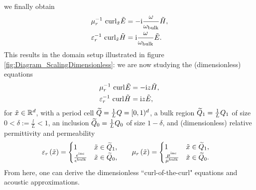 we finally obtain
\begin{align*}
	\mu_r^{-1} \ \mathrm{curl}_{\tilde{x}}\tilde{E} 
	&= -\mathrm{i}\frac{\omega}{\omega_{\mathrm{bulk}}} \tilde{H}, \\
	\varepsilon_r^{-1} \ \mathrm{curl}_{\tilde{x}}\tilde{H} 
	&= \mathrm{i}\frac{\omega}{\omega_{\mathrm{bulk}}} \tilde{E}.
\end{align*}
This results in the domain setup illustrated in figure \ref{fig:Diagram_ScalingDimensionless}: we are now studying the (dimensionless) equations
\begin{subequations}
	\begin{align} \label{eq:Intro-NonDimMaxwell}
		\mu_r^{-1} \ \mathrm{curl}_{}\tilde{E} 
		&= -\mathrm{i} z \tilde{H}, \\
		\varepsilon_r^{-1} \ \mathrm{curl}_{}\tilde{H} 
		&= \mathrm{i} z \tilde{E},
	\end{align}
\end{subequations}
for $\tilde{x}\in\mathbb{R}^d$, with a period cell $\widetilde{Q} = \frac{1}{L}Q = [0,1)^d$, a bulk region $\widetilde{Q}_1 = \frac{1}{L}Q_1$ of size $0<\delta:=\frac{l}{L}<1$, an inclusion $\widetilde{Q}_0 = \frac{1}{L} Q_0$ of size $1-\delta$, and (dimensionless) relative permittivity and permeability
\begin{align*}
	\varepsilon_r\left( \tilde{x} \right) = 
	\begin{cases} 
		1 & \tilde{x}\in\widetilde{Q}_1, \\ 
		\frac{\epsilon^{\mathrm{inc}}}{\epsilon^{\mathrm{bulk}}} & \tilde{x}\in\widetilde{Q}_0, 
	\end{cases}
	&\qquad
	\mu_r\left( \tilde{x} \right) = 
	\begin{cases} 
		1 & \tilde{x}\in\widetilde{Q}_1, \\ 
		\frac{\mu^{\mathrm{inc}}}{\mu^{\mathrm{bulk}}} & \tilde{x}\in\widetilde{Q}_0.
	\end{cases}
\end{align*}
From here, one can derive the dimensionless ``curl-of-the-curl" equations and acoustic approximations.


